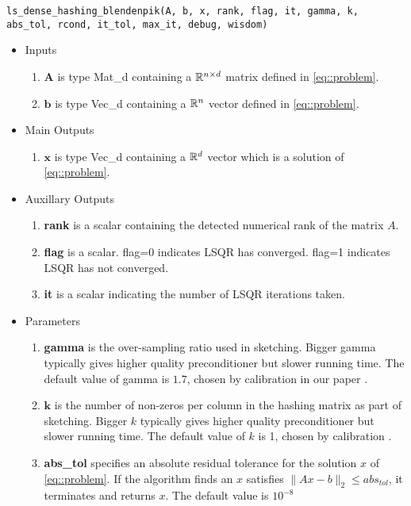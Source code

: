 \documentclass[english,11pt]{article}
\begin{document}
{\tt ls_dense_hashing_blendenpik(A, b, x, rank, flag, it, gamma, k, abs_tol, rcond, it_tol, max_it, debug, wisdom)}
	\begin{itemize}
	\setlength\itemsep{-0.5em}
	\item Inputs 
		\begin{enumerate}
			\item $\mathbf A$ is type Mat_d containing a $\mathbb{R}^{n \times d}$ matrix defined in \eqref{eq::problem}.
			\item $\mathbf b$ is type Vec_d containing a $\mathbb{R}^n$ vector defined in \eqref{eq::problem}.
		\end{enumerate}
	
	\item Main Outputs
		\begin{enumerate}
			\item { $\mathbf x$} is type Vec_d containing a $\mathbb{R}^d$ vector which is a solution of \eqref{eq::problem}.
		\end{enumerate}

	\item Auxillary Outputs
		\begin{enumerate}
			\item {\bf rank} is a scalar containing the detected numerical rank of the matrix $A$. 
			\item {\bf flag} is a scalar. flag=0 indicates LSQR has converged. flag=1 indicates LSQR has not converged. 
			\item {\bf it} is a scalar indicating the number of LSQR iterations taken. 
		\end{enumerate}
		

	\item Parameters
		\begin{enumerate}
			\item {\bf gamma} is the over-sampling ratio used in sketching. Bigger gamma typically gives higher quality preconditioner but slower running time. The default value of gamma is $1.7$, chosen by calibration in our paper \cite{Zhen:OpOnline}.

			\item $\mathbf k$ is the number of non-zeros per column in the hashing matrix as part of sketching. Bigger $k$ typically gives higher quality preconditioner but slower running time. The default value of $k$ is 1, chosen by calibration \cite{Zhen:OpOnline}.

			\item {\bf abs_tol} specifies an absolute residual tolerance for the solution $x$ of \ref{eq::problem}. If the algorithm finds an $x$ satisfies $\|Ax-b\|_2 \leq abs_{tol}$, it terminates and returns $x$. The default value is $10^{-8}$


\end{enumerate}
\end{itemize}
\end{document}
